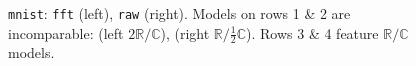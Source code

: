 \documentclass[a4paper,10pt,onecolumn]{article}
\newcommand{\real}{\mathbb{R}}
\newcommand{\cplx}{\mathbb{C}}
\begin{document}
\begin{figure}[b]
\begin{subfigure}[b]{0.5\columnwidth}
  \end{subfigure}
  \caption{%
    \texttt{mnist}:
      \texttt{fft} (left), \texttt{raw} (right).
      Models on rows 1 \& 2 are incomparable: (left $2\real / \cplx$), (right $\real / \tfrac12\cplx$).
      Rows 3 \& 4 feature $\real / \cplx$ models.
  }
\end{figure}
\end{document}
